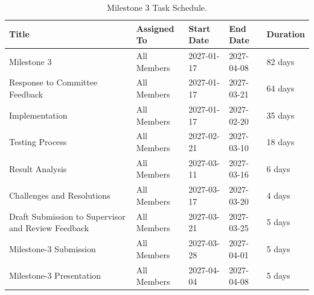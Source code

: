 \documentclass[11pt,a4paper]{report}
\begin{document}
\begin{table}[H]
\centering
\caption[Milestone 3 Task Schedule]{Milestone 3 Task Schedule.}
\begin{tabular}{|p{}| p{}| p{}| p{}| p{}|}
\hline
\textbf{Title} & \textbf{Assigned To} & \textbf{Start Date} & \textbf{End Date} & \textbf{Duration} \\
\hline
Milestone 3 & All Members & 2027-01-17 & 2027-04-08 & 82 days \\
\hline
Response to Committee Feedback & All Members & 2027-01-17 & 2027-03-21 & 64 days \\
\hline
Implementation & All Members & 2027-01-17 & 2027-02-20 & 35 days \\
\hline
Testing Process & All Members & 2027-02-21 & 2027-03-10 & 18 days \\
\hline
Result Analysis & All Members & 2027-03-11 & 2027-03-16 & 6 days \\
\hline
Challenges and Resolutions & All Members & 2027-03-17 & 2027-03-20 & 4 days \\
\hline
Draft Submission to Supervisor and Review Feedback & All Members & 2027-03-21 & 2027-03-25 & 5 days \\
\hline
Milestone-3 Submission & All Members & 2027-03-28 & 2027-04-01 & 5 days \\
\hline
Milestone-3 Presentation & All Members & 2027-04-04 & 2027-04-08 & 5 days \\
\hline
\end{tabular}
\label{tab:milestone3_schedule}
\end{table}
\end{document}
